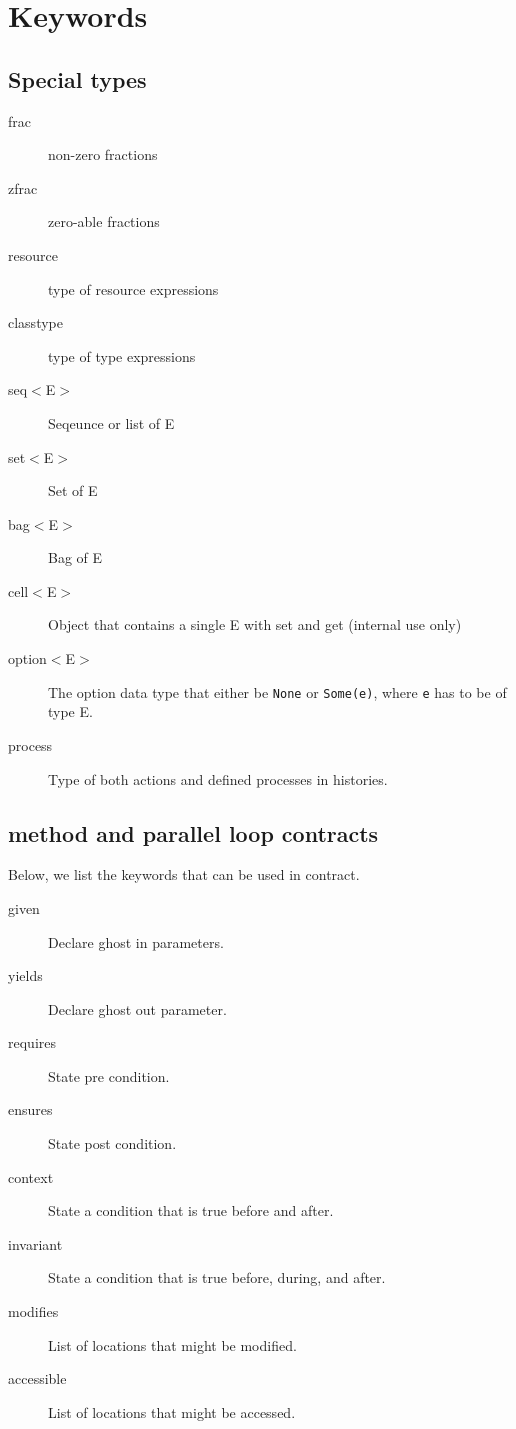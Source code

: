 \chapter{Keywords}

\section*{Special types}
\begin{description}
\item[frac] non-zero fractions
\item[zfrac] zero-able fractions
\item[resource] type of resource expressions
\item[classtype] type of type expressions
\item[seq$<$E$>$] Seqeunce or list of E
\item[set$<$E$>$] Set of E
\item[bag$<$E$>$] Bag of E
\item[cell$<$E$>$] Object that contains a single E with set and get (internal use only)
\item[option$<$E$>$] The option data type that either be \lstinline+None+ or
\lstinline+Some(e)+, where \lstinline+e+ has to be of type E.
\item[process] Type of both actions and defined processes in histories.
\end{description}

\section*{method and parallel loop contracts}

Below, we list the keywords that can be used in contract.

\begin{description}
\item[given] Declare ghost in parameters.
\item[yields] Declare ghost out parameter.
\item[requires] State pre condition.
\item[ensures] State post condition.
\item[context] State a condition that is true before and after.
\item[invariant] State a condition that is true before, during, and after.
\item[modifies] List of locations that might be modified.
\item[accessible] List of locations that might be accessed.
\end{description}

